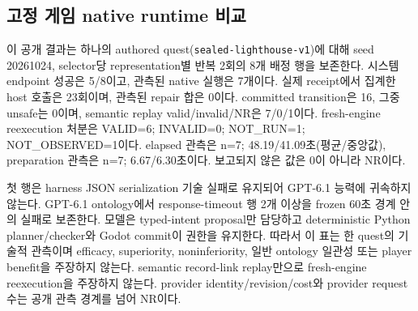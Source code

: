 \subsection{고정 게임 native runtime 비교}
이 공개 결과는 하나의 authored quest(\texttt{sealed-lighthouse-v1})에 대해 seed 20261024, selector당 representation별 반복 2회의 8개 배정 행을 보존한다. 시스템 endpoint 성공은 5/8이고, 관측된 native 실행은 7개이다. 실제 receipt에서 집계한 host 호출은 23회이며, 관측된 repair 합은 0이다. committed transition은 16, 그중 unsafe는 0이며, semantic replay valid/invalid/NR은 7/0/1이다. fresh-engine reexecution 처분은 VALID=6; INVALID=0; NOT\_RUN=1; NOT\_OBSERVED=1이다. elapsed 관측은 n=7; 48.19/41.09초(평균/중앙값), preparation 관측은 n=7; 6.67/6.30초이다. 보고되지 않은 값은 0이 아니라 NR이다.

첫 행은 harness JSON serialization 기술 실패로 유지되어 GPT-6.1 능력에 귀속하지 않는다. GPT-6.1 ontology에서 response-timeout 행 2개 이상을 frozen 60초 경계 안의 실패로 보존한다. 모델은 typed-intent proposal만 담당하고 deterministic Python planner/checker와 Godot commit이 권한을 유지한다. 따라서 이 표는 한 quest의 기술적 관측이며 efficacy, superiority, noninferiority, 일반 ontology 일관성 또는 player benefit을 주장하지 않는다. semantic record-link replay만으로 fresh-engine reexecution을 주장하지 않는다. provider identity/revision/cost와 provider request 수는 공개 관측 경계를 넘어 NR이다.
